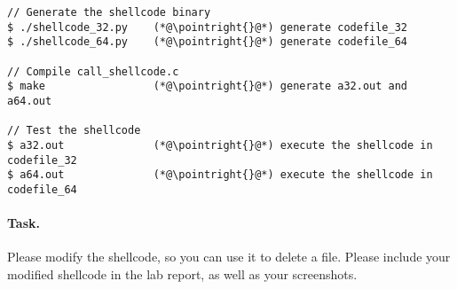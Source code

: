 \begin{lstlisting}
// Generate the shellcode binary 
$ ./shellcode_32.py    (*@\pointright{}@*) generate codefile_32
$ ./shellcode_64.py    (*@\pointright{}@*) generate codefile_64

// Compile call_shellcode.c
$ make                 (*@\pointright{}@*) generate a32.out and a64.out 

// Test the shellcode 
$ a32.out              (*@\pointright{}@*) execute the shellcode in codefile_32
$ a64.out              (*@\pointright{}@*) execute the shellcode in codefile_64
\end{lstlisting}
\fi 
 

\paragraph{Task.} Please modify the shellcode, so you can
use it to delete a file.  Please include your modified shellcode
in the lab report, as well as your screenshots.

